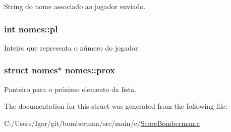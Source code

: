 String do nome associado ao jogador enviado. 

\hypertarget{structnomes_a182964ec5b7c9d96a8f16f78318ac11a}{
\subsubsection[{pl}]{\setlength{\rightskip}{0pt plus 5cm}int nomes\+::pl}}\label{structnomes_a182964ec5b7c9d96a8f16f78318ac11a}


Inteiro que representa o número do jogador. 

\hypertarget{structnomes_ade6bd8ebe71f4a7b1118639da56e67cf}{
\subsubsection[{prox}]{\setlength{\rightskip}{0pt plus 5cm}struct {\bf nomes}$\ast$ nomes\+::prox}}\label{structnomes_ade6bd8ebe71f4a7b1118639da56e67cf}


Ponteiro para o próximo elemento da lista. 



The documentation for this struct was generated from the following file\+:\begin{DoxyCompactItemize}
\item 
C\+:/\+Users/\+Igor/git/bomberman/src/main/c/\hyperlink{_score_bomberman_8c}{Score\+Bomberman.\+c}\end{DoxyCompactItemize}
